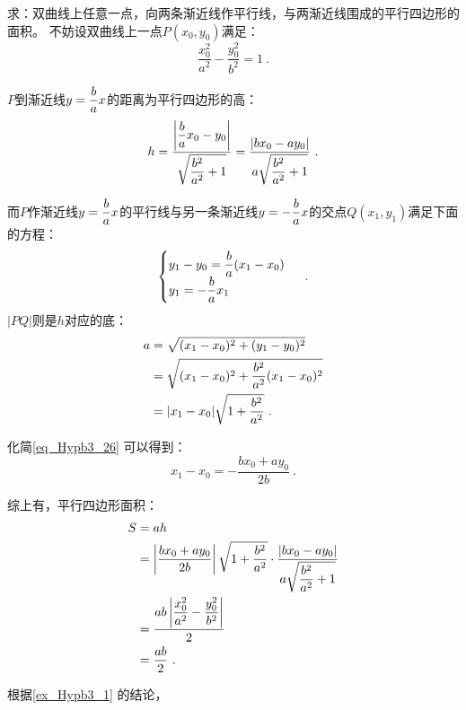 \begin{example}{求：双曲线上任意一点，向两条渐近线作平行线，与两渐近线围成的平行四边形的面积。}
不妨设双曲线上一点$P(x_0,y_0)$满足：
\begin{equation}
\frac{x_0^2}{a^2}-\frac{y_0^2}{b^2}=1~.
\end{equation}

$P$到渐近线$\displaystyle y={b\over a} x$的距离为平行四边形的高：
\begin{equation}
h=\frac{\left|\displaystyle{b\over a}x_0-y_0\right|}{\displaystyle\sqrt{{b^2\over a^2}+1}}=\frac{|\displaystyle bx_0-ay_0|}{a\displaystyle\sqrt{{b^2\over a^2}+1}}~.
\end{equation}

而$P$作渐近线$\displaystyle y={b\over a} x$的平行线与另一条渐近线$\displaystyle y=-{b\over a} x$的交点$Q(x_1,y_1)$满足下面的方程：
\begin{equation}\label{eq_Hypb3_26}
\begin{cases}
y_1-y_0=\displaystyle{b\over a}(x_1-x_0)\\
y_1=\displaystyle-{b\over a} x_1
\end{cases}~.
\end{equation}
$|PQ|$则是$h$对应的底：
\begin{equation}
\begin{split}
a&=\sqrt{(x_1-x_0)^2+(y_1-y_0)^2}\\
&=\sqrt{(x_1-x_0)^2+{b^2\over a^2}(x_1-x_0)^2}\\
&=|x_1-x_0|\sqrt{1+{b^2\over a^2}}~.
\end{split}
\end{equation}

化简\autoref{eq_Hypb3_26} 可以得到：
\begin{equation}
x_1-x_0=-\frac{bx_0+ay_0}{2b}~.
\end{equation}

综上有，平行四边形面积：
\begin{equation}
\begin{split}
S&=ah\\
&=\left|\frac{bx_0+ay_0}{2b}\right|\sqrt{1+{b^2\over a^2}}\cdot\frac{|\displaystyle bx_0-ay_0|}{a\displaystyle\sqrt{{b^2\over a^2}+1}}\\
&=\frac{ab\left|\displaystyle\frac{x_0^2}{a^2}-\frac{y_0^2}{b^2}\right|}{2}\\
&=\frac{ab}{2}~.
\end{split}
\end{equation}
\end{example}
根据\autoref{ex_Hypb3_1} 的结论，

